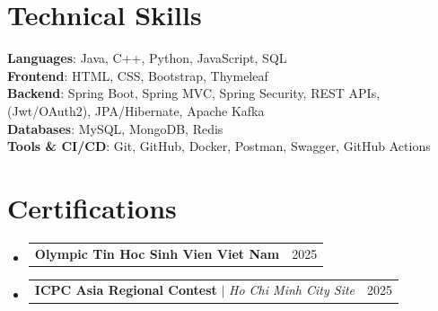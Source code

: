 \documentclass[letterpaper,11pt]{article}
\makeatletter
\newcommand{\resumeProjectHeading}[2]{
  \item
  \begin{tabular*}{0.97\textwidth}{l@{\extracolsep{\fill}}r}
    \small#1 & #2
  \end{tabular*}\vspace{-7pt}
}
\newcommand{\resumeSubHeadingListStart}{\begin{itemize}[leftmargin=0.15in, label={}]}
\newcommand{\resumeSubHeadingListEnd}{\end{itemize}}
\makeatother
\begin{document}
\section{Technical Skills}
\begin{itemize}[leftmargin=0.15in, label={}]
\small{\item{

\textbf{Languages}: Java, C++, Python, JavaScript, SQL \\

\textbf{Frontend}: HTML, CSS, Bootstrap, Thymeleaf \\

\textbf{Backend}: Spring Boot, Spring MVC, Spring Security, REST APIs, (Jwt/OAuth2), JPA/Hibernate, Apache Kafka \\

\textbf{Databases}: MySQL, MongoDB, Redis \\

\textbf{Tools \& CI/CD}: Git, GitHub, Docker, Postman, Swagger, GitHub Actions

}}
\end{itemize}

\section{Certifications}
\resumeSubHeadingListStart
  \resumeProjectHeading
    {\textbf{Olympic Tin Hoc Sinh Vien Viet Nam}}{2025}
  \resumeProjectHeading
    {\textbf{ICPC Asia Regional Contest} $|$ \emph{Ho Chi Minh City Site}}{2025}
\resumeSubHeadingListEnd
\end{document}
